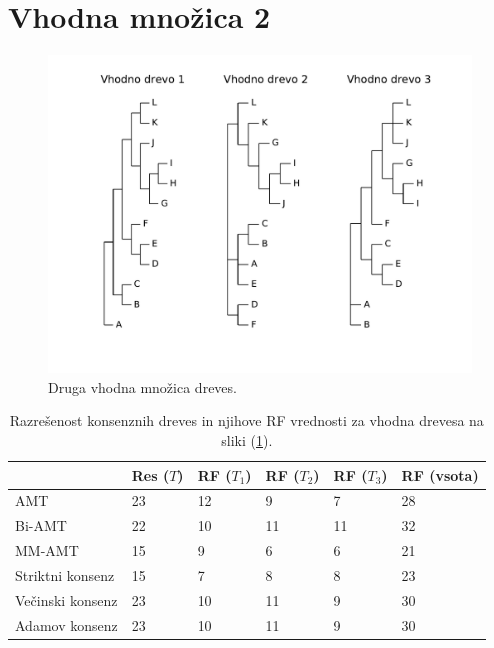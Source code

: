 \documentclass[a4paper, 12pt]{book}
\begin{document}
\section{Vhodna množica 2}
\begin{figure}[h!]
	\begin{center}
		\includegraphics[scale=0.55, clip=true, trim=1cm 2cm 1cm 0]{gfx/eval_input_2.pdf}
	\end{center}
	\caption{Druga vhodna množica dreves.}
	\label{img-eval-input-2}
\end{figure}

\begin{table}[h!]
	\begin{center}
	{\footnotesize
	\begin{tabular}{ l| l | l | l | l | l }
	~                & Res ($T$) & RF ($T_1$) & RF ($T_2$) & RF ($T_3$) & RF (vsota) \\ \hline
	AMT              & 23          & 12            & 9             & 7             & 28         \\ \hline
	Bi-AMT           & 22          & 10            & 11            & 11            & 32         \\ \hline
	MM-AMT           & 15          & 9             & 6             & 6             & 21         \\ \hline
	Striktni konsenz & 15          & 7             & 8             & 8             & 23         \\ \hline
	Večinski konsenz & 23          & 10            & 11            & 9             & 30         \\ \hline
	Adamov konsenz   & 23          & 10            & 11            & 9             & 30         \\ \hline
	\end{tabular}
	\caption{Razrešenost konsenznih dreves in njihove RF vrednosti za vhodna drevesa na sliki (\ref{img-eval-input-2}).}
	}
	\label{table-eval-2}
	\end{center}		
\end{table}
\end{document}
